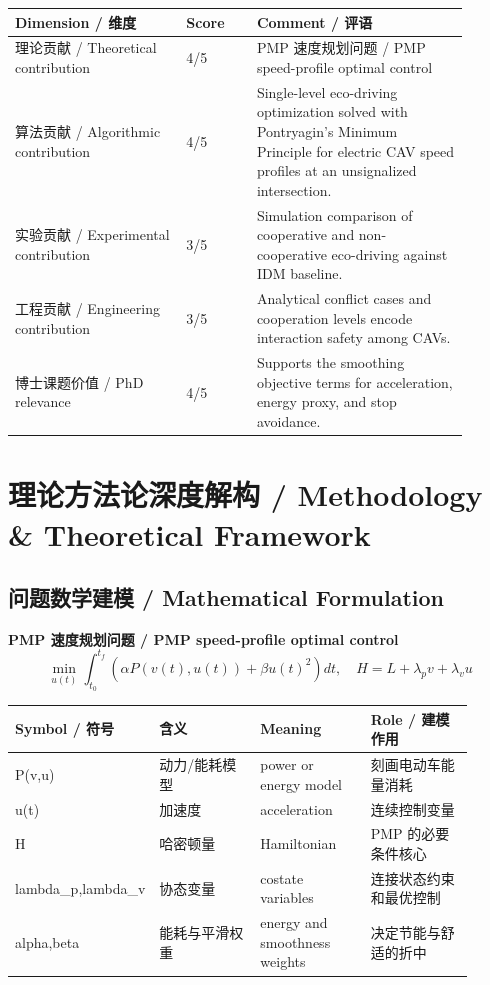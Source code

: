 \documentclass[UTF8,a4paper,11pt,fontset=fandol]{ctexart}
\begin{document}
\begin{longtable}{p{0.34\linewidth}p{0.14\linewidth}p{0.42\linewidth}}
\toprule
Dimension / 维度 & Score & Comment / 评语\\
\midrule
理论贡献 / Theoretical contribution & 4/5 & PMP 速度规划问题 / PMP speed-profile optimal control \\
算法贡献 / Algorithmic contribution & 4/5 & Single-level eco-driving optimization solved with Pontryagin's Minimum Principle for electric CAV speed profiles at an unsignalized intersection. \\
实验贡献 / Experimental contribution & 3/5 & Simulation comparison of cooperative and non-cooperative eco-driving against IDM baseline. \\
工程贡献 / Engineering contribution & 3/5 & Analytical conflict cases and cooperation levels encode interaction safety among CAVs. \\
博士课题价值 / PhD relevance & 4/5 & Supports the smoothing objective terms for acceleration, energy proxy, and stop avoidance. \\
\bottomrule
\end{longtable}

\section{理论方法论深度解构 / Methodology \& Theoretical Framework}
\subsection{问题数学建模 / Mathematical Formulation}
\textbf{PMP 速度规划问题 / PMP speed-profile optimal control}
\[
\min_{u(t)}\int_{t_0}^{t_f}\left(\alpha P(v(t),u(t))+\beta u(t)^2\right)dt,\quad H=L+\lambda_p v+\lambda_v u
\]
\begin{longtable}{p{0.16\linewidth}p{0.25\linewidth}p{0.25\linewidth}p{0.25\linewidth}}
\toprule
Symbol / 符号 & 含义 & Meaning & Role / 建模作用\\
\midrule
P(v,u) & 动力/能耗模型 & power or energy model & 刻画电动车能量消耗 \\
u(t) & 加速度 & acceleration & 连续控制变量 \\
H & 哈密顿量 & Hamiltonian & PMP 的必要条件核心 \\
lambda\_p,lambda\_v & 协态变量 & costate variables & 连接状态约束和最优控制 \\
alpha,beta & 能耗与平滑权重 & energy and smoothness weights & 决定节能与舒适的折中 \\
\bottomrule
\end{longtable}
\end{document}
